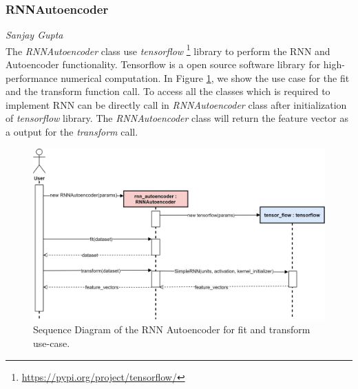 \subsubsection*{RNNAutoencoder}
\vspace*{-10mm}\hfill{\normalsize\emph{Sanjay Gupta}}
\\
The \textit{RNNAutoencoder} class use \textit{tensorflow} \footnote{\href{https://pypi.org/project/tensorflow/}{https://pypi.org/project/tensorflow/}} library to perform the RNN and Autoencoder functionality. Tensorflow is a open source software library for high-performance numerical computation. In Figure \ref{fig:rnn-seq}, we show the use case for the fit and the transform function call. To access all the classes which is required to implement RNN can be directly call in \textit{RNNAutoencoder} class after initialization of \textit{tensorflow} library. The \textit{RNNAutoencoder} class will return the feature vector as a output for the \textit{transform} call.
\begin{figure}[ht]
    \centering
    \includegraphics[width=\textwidth]{gfx/RNN-Sequence}
    \caption{Sequence Diagram of the RNN Autoencoder for fit and transform use-case.}
    \label{fig:rnn-seq}
\end{figure}
